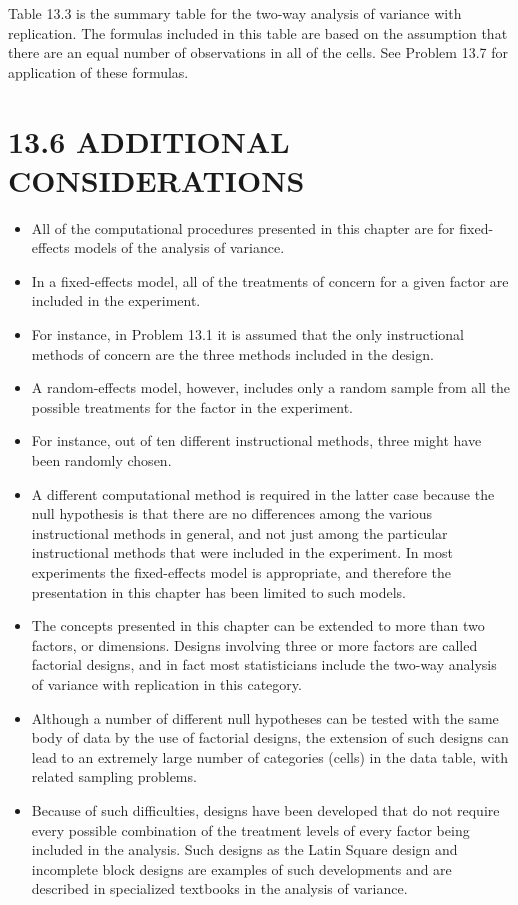 \documentclass[]{article}
\begin{document}
Table 13.3 is the summary table for the two-way analysis of variance with replication. The formulas
included in this table are based on the assumption that there are an equal number of observations in all of the
cells. See Problem 13.7 for application of these formulas.
\newpage
\section{13.6 ADDITIONAL CONSIDERATIONS}
\begin{itemize}
\item All of the computational procedures presented in this chapter are for fixed-effects models of the analysis of
variance. 
\item In a fixed-effects model, all of the treatments of concern for a given factor are included in the
experiment. 
\item For instance, in Problem 13.1 it is assumed that the only instructional methods of concern are the
three methods included in the design. 
\item A random-effects model, however, includes only a random sample from
all the possible treatments for the factor in the experiment.
\item For instance, out of ten different instructional
methods, three might have been randomly chosen. 
\item A different computational method is required in the latter
case because the null hypothesis is that there are no differences among the various instructional methods in
general, and not just among the particular instructional methods that were included in the experiment. In most
experiments the fixed-effects model is appropriate, and therefore the presentation in this chapter has been
limited to such models.


\item The concepts presented in this chapter can be extended to more than two factors, or dimensions. Designs
involving three or more factors are called factorial designs, and in fact most statisticians include the two-way
analysis of variance with replication in this category. 
\item Although a number of different null hypotheses can be
tested with the same body of data by the use of factorial designs, the extension of such designs can lead to an
extremely large number of categories (cells) in the data table, with related sampling problems. 
\item Because of such
difficulties, designs have been developed that do not require every possible combination of the treatment levels
of every factor being included in the analysis. Such designs as the Latin Square design and incomplete block
designs are examples of such developments and are described in specialized textbooks in the analysis of
variance.



\end{itemize}
\end{document}
